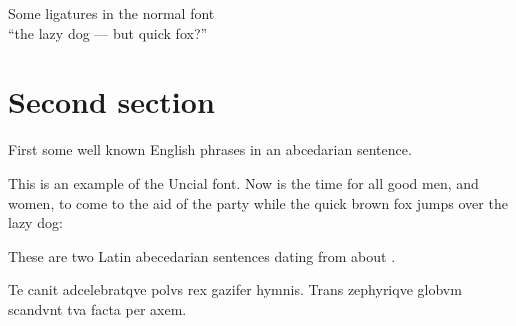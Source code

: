 \documentclass{article}
\newcommand{\Romannum}[1]{\uppercase\expandafter{\romannumeral #1}}
\newcommand{\Sentence}{%
This is an example of the Uncial font. Now is the time for all good
men, and women, to come to the aid of the party while the quick brown fox
jumps over the lazy dog:}
\newcommand{\latin}{Te canit adcelebratqve polvs rex gazifer hymnis.
  Trans zephyriqve globvm scandvnt tva facta per axem.}
\begin{document}
\begin{center}
    Some ligatures in the normal font \\
{``the lazy dog --- but quick fox?''}
\end{center}

\section{Second section}

    First some well known English phrases in an abcedarian sentence.

\Sentence{}

    These are two Latin abecedarian sentences dating from about 
\Romannum{790}.

\latin{}

    
\end{document}
